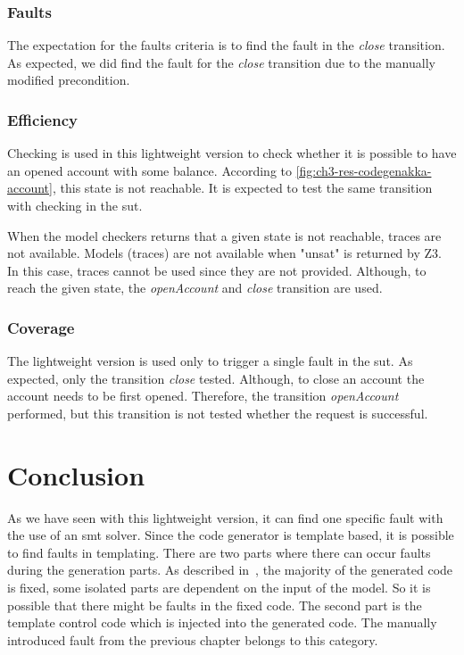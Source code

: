 \subsubsection{Faults}
The expectation for the faults criteria is to find the fault in the \textit{close} transition.
As expected, we did find the fault for the \textit{close}
transition due to the manually modified precondition.

\subsubsection{Efficiency}

Checking is used in this lightweight version to check whether it is possible
to have an opened account with some balance. According to
\autoref{fig:ch3-res-codegenakka-account}, this state is not reachable. It is
expected to test the same transition with checking in the \gls{sut}.

When the model checkers returns that a given state is not reachable,
traces are not available. Models (traces) are not available when "unsat" is
returned by Z3.
In this case, traces cannot be used since they are not provided. Although, to
reach the given state, the \textit{openAccount} and \textit{close} transition
are used.

\subsubsection{Coverage}
The lightweight version is used only to trigger a single fault in the \gls{sut}. As
expected, only the transition \textit{close} tested. Although, to close an
account the account needs to be first opened. Therefore, the transition
\textit{openAccount} performed, but this transition is not tested whether the
request is successful.

\section{Conclusion}

As we have seen with this lightweight version, it can find one specific fault with the use of an \gls{smt} solver. Since the code generator is template based, it is possible to find faults in templating. There are two parts where there can occur faults during the generation parts. As described in~\cite[p.~274]{voelter2013dsl}, the majority of the generated code is fixed, some isolated parts are dependent on the input of the model. So it is possible that there might be faults in the fixed code. The second part is the template control code which is injected into the generated code. The manually introduced fault from the previous chapter belongs  to this category.
